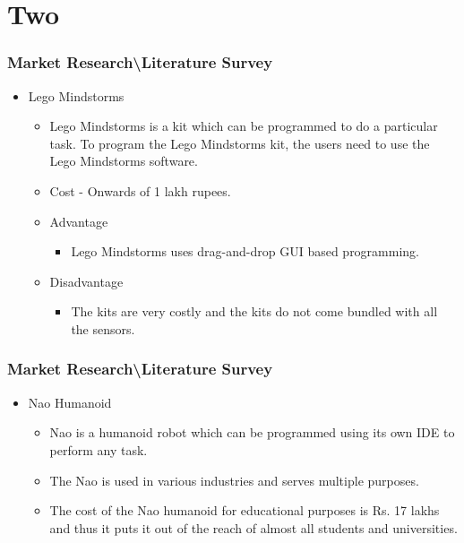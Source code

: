 \documentclass{beamer}
\begin{document}
\section{Two}  
\begin{frame}
\frametitle{Market Research\textbackslash Literature Survey}
\begin{center}
\justifying
\begin{itemize}
\item Lego Mindstorms
\begin{itemize}
\item Lego Mindstorms is a kit which can be programmed to do a particular task. To
program the Lego Mindstorms kit, the users need to use the Lego Mindstorms
software.
\item Cost - Onwards of 1 lakh rupees.
\item Advantage
	\begin{itemize}
	\item Lego Mindstorms uses drag-and-drop GUI based programming.
	\end{itemize}
\item Disadvantage
	\begin{itemize}
	\item The kits are very costly and the kits do not come bundled with all the sensors.
	\end{itemize}	
\end{itemize}
\end{itemize}
\end{center}
\end{frame}  

\begin{frame}
\frametitle{Market Research\textbackslash Literature Survey}
\begin{center}
\justifying
\begin{itemize}
\item Nao Humanoid
\begin{itemize}
\item Nao is a humanoid robot which can be programmed using its own IDE to perform any task.
\item The Nao is used in various industries and serves multiple purposes.
\item The cost of the Nao humanoid for educational purposes is Rs. 17 lakhs and thus it puts it out of the reach of almost all students and universities.
\end{itemize}

\end{itemize}
\end{center}
\end{frame}  
\end{document}
